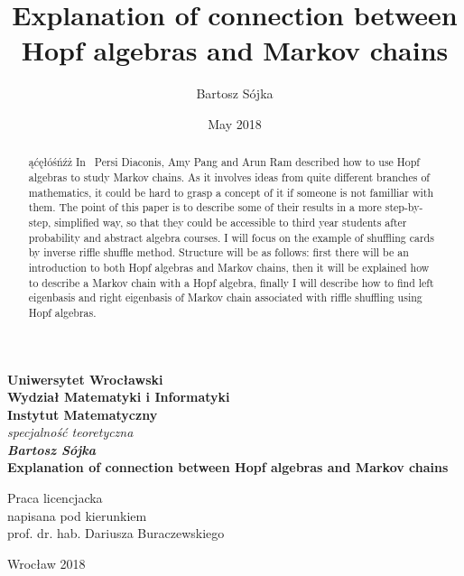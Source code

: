 \documentclass[a4paper, 12pt]{article}
\title{Explanation of connection between Hopf algebras and Markov chains}
\author{Bartosz Sójka}
\date{May 2018}
\begin{document}
\thispagestyle{empty}
\begin{center}
\textbf{\large Uniwersytet Wrocławski\\
Wydział Matematyki i Informatyki\\
Instytut Matematyczny}\\
\textit{\large specjalność teoretyczna}\\
\vspace{4cm}
\textbf{\textit{\large Bartosz Sójka}\\
\vspace{0.5cm}
{\Large Explanation of connection between Hopf algebras and Markov chains}}\\
\end{center}
\vspace{3cm}
{\large \hspace*{6.5cm}Praca licencjacka\\
\hspace*{6.5cm}napisana pod kierunkiem\\
\hspace*{6.5cm}prof. dr. hab. Dariusza Buraczewskiego }\\
\vfill
\begin{center}
{\large Wrocław 2018}\\
\end{center}
\newpage
\null
\thispagestyle{empty}
\newpage
\tableofcontents

\begin{abstract}

ąćęłóśńźż In~\cite{Diaconis2014} Persi Diaconis, Amy Pang and Arun Ram described how to use Hopf algebras to
study Markov chains. As it involves ideas from quite different branches of mathematics, it could be hard to
grasp a concept of it if someone is not familliar with them.
The point of this paper is to describe some of their results in a more step-by-step, simplified way,
so that they could be accessible to third year students after probability
and abstract algebra courses. I will focus on the example of shuffling cards by inverse riffle shuffle
method. Structure will be as follows: first there will be an introduction to both Hopf algebras and Markov
chains, then it will be explained how to describe a Markov chain with a Hopf algebra, finally I will
describe how to find left eigenbasis and right eigenbasis of Markov chain associated with riffle shuffling
using Hopf algebras.
\end{abstract}
\end{document}
